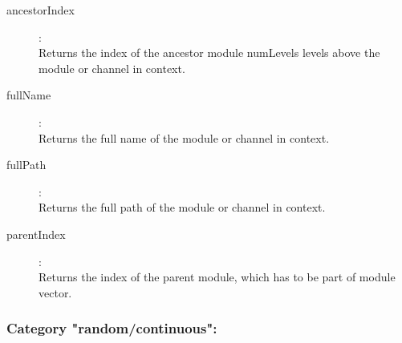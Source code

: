\begin{description}
\item[ancestorIndex]:  \\
    Returns the index of the ancestor module numLevels levels above the module or channel in context.
\item[fullName]:  \\
    Returns the full name of the module or channel in context.
\item[fullPath]:  \\
    Returns the full path of the module or channel in context.
\item[parentIndex]:  \\
    Returns the index of the parent module, which has to be part of module vector.

\end{description}

\subsubsection{Category "random/continuous":}

